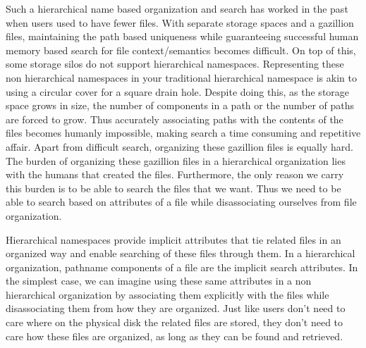 Such a hierarchical name based organization and search has worked in the past when users used to have fewer files. With separate storage spaces and a gazillion files, maintaining the path based uniqueness while guaranteeing successful human memory based search for file context/semantics becomes difficult. On top of this, some storage silos do not support hierarchical namespaces. Representing these non hierarchical namespaces in your traditional hierarchical namespace is akin to using a circular cover for a square drain hole. Despite doing this, as the storage space grows in size, the number of components in a path or the number of paths are forced to grow. Thus accurately associating paths with the contents of the files becomes humanly impossible, making search a time consuming and repetitive affair. Apart from difficult search, organizing these gazillion files is equally hard. The burden of organizing these gazillion files in a hierarchical organization lies with the humans that created the files. Furthermore, the only reason we carry this burden is to be able to search the files that we want. Thus we need to be able to search based on attributes of a file while disassociating ourselves from file organization.

Hierarchical namespaces provide implicit attributes that tie related files in an organized way and enable searching of these files through them. In a hierarchical organization, pathname components of a file are the implicit search attributes. In the simplest case, we can imagine using these same attributes in a non hierarchical organization by associating them explicitly with the files while disassociating them from how they are organized.  Just like users don’t need to care where on the physical disk the related files are stored, they don’t need to care how these files are organized, as long as they can be found and retrieved.

